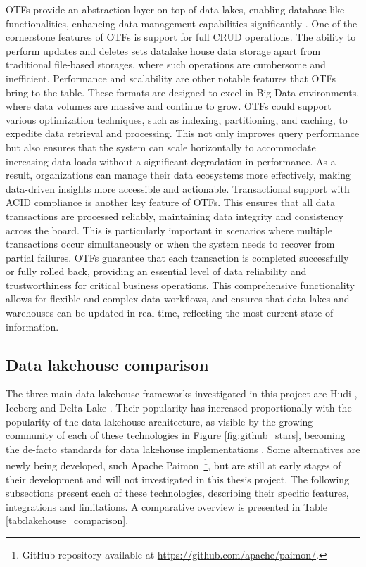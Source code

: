 \glspl{OTF} provide an abstraction layer on top of data lakes, enabling database-like functionalities, enhancing data management capabilities significantly \cite{lakehouse2021,DataLakehouseSurvey2025}. One of the cornerstone features of \glspl{OTF} is support for full \gls{CRUD} operations. The ability to perform updates and deletes sets datalake house data storage apart from traditional file-based storages, where such operations are cumbersome and inefficient. Performance and scalability are other notable features that \glspl{OTF} bring to the table. These formats are designed to excel in Big Data environments, where data volumes are massive and continue to grow. \glspl{OTF} could support various optimization techniques, such as indexing, partitioning, and caching, to expedite data retrieval and processing. This not only improves query performance but also ensures that the system can scale horizontally to accommodate increasing data loads without a significant degradation in performance. As a result, organizations can manage their data ecosystems more effectively, making data-driven insights more accessible and actionable. Transactional support with \gls{ACID} compliance is another key feature of \glspl{OTF}. This ensures that all data transactions are processed reliably, maintaining data integrity and consistency across the board. This is particularly important in scenarios where multiple transactions occur simultaneously or when the system needs to recover from partial failures. \glspl{OTF} guarantee that each transaction is completed successfully or fully rolled back, providing an essential level of data reliability and trustworthiness for critical business operations. This comprehensive functionality allows for flexible and complex data workflows, and ensures that data lakes and warehouses can be updated in real time, reflecting the most current state of information.



\subsection{Data lakehouse comparison}
\label{subsec:datalakehouse_comparison}

The three main data lakehouse frameworks investigated in this project are Hudi \cite{rajaperumalUberEngineeringIncremental2017}, Iceberg \cite{IcebergExamples2024} and Delta Lake \cite{armbrustDeltaLakeHighperformance2020}. Their popularity has increased proportionally with the popularity of the data lakehouse architecture, as visible by the growing community of each of these technologies in Figure \ref{fig:github_stars}, becoming the de-facto standards for data lakehouse implementations \cite{jainAnalyzingComparingLakehouse2023}. Some alternatives are newly being developed, such Apache Paimon~\footnote{GitHub repository available at \url{https://github.com/apache/paimon/}.}, but are still at early stages of their development and will not investigated in this thesis project. The following subsections present each of these technologies, describing their specific features, integrations and limitations. A comparative overview is presented in Table \ref{tab:lakehouse_comparison}.

